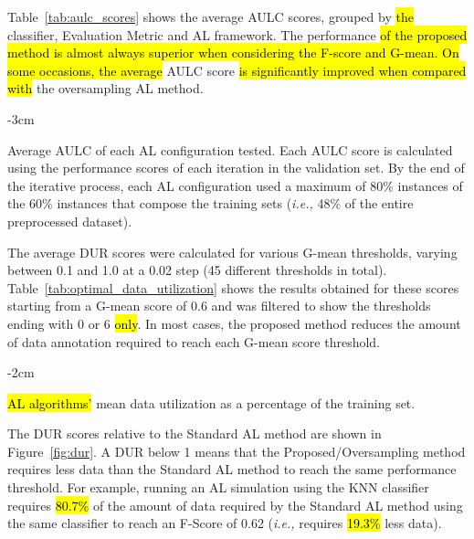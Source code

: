 \documentclass[preprint, 12pt]{elsarticle}
\begin{document}
Table~\ref{tab:aulc_scores} shows the average AULC scores, grouped by \hl{the}
classifier, Evaluation Metric and AL framework. The 
performance \hl{of the proposed method is almost always superior when
considering the F-score and G-mean. On some occasions, the average} AULC score
\hl{is significantly improved when compared with} the oversampling AL method.

\begin{table}
	\centering
    \addtolength{\leftskip} {-3cm}
    \addtolength{\rightskip}{-3cm}
    \caption{\label{tab:aulc_scores}
        Average AULC of each AL configuration tested. Each AULC score is
        calculated using the performance scores of each iteration in the
        validation set. By the end of the iterative process, each AL
        configuration used a maximum of 80\% instances of the 60\% instances
        that compose the training sets (\textit{i.e.,} 48\% of the entire
        preprocessed dataset).
    }
\end{table}

The average DUR scores were calculated for various G-mean thresholds, varying
between 0.1 and 1.0 at a 0.02 step (45 different thresholds in total).
Table~\ref{tab:optimal_data_utilization} shows the results obtained for these
scores starting from a G-mean score of 0.6 and was filtered to show the
thresholds ending with 0 or 6 \hl{only}. In most cases, the proposed method reduces the
amount of data annotation required to reach each G-mean score threshold.

\begin{table}
    \centering
    \addtolength{\leftskip} {-2cm}
    \addtolength{\rightskip}{-2cm}
    \caption{\label{tab:optimal_data_utilization}
        \hl{AL algorithms'} mean data utilization as a percentage of the
        training set.
    }
\end{table}

The DUR scores relative to the Standard AL method are shown in
Figure~\ref{fig:dur}. A DUR below 1 means that the Proposed/Oversampling
method requires less data than the Standard AL method to reach the same
performance threshold. For example, running an AL simulation using the KNN
classifier requires \hl{80.7\%} of the amount of data required by the Standard AL
method using the same classifier to reach an F-Score of 0.62 (\textit{i.e.,}
requires \hl{19.3\%} less data).
\end{document}
